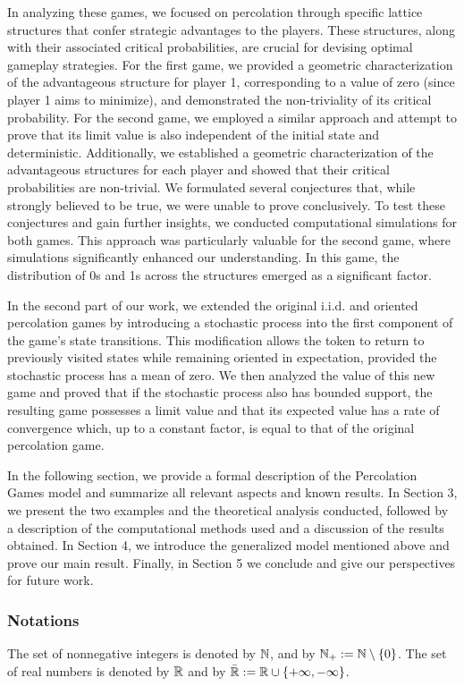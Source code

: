 	In analyzing these games, we focused on percolation through specific lattice structures that confer strategic advantages to the players. These structures, along with their associated critical probabilities, are crucial for devising optimal gameplay strategies. For the first game, we provided a geometric characterization of the advantageous structure for player 1, corresponding to a value of zero (since player 1 aims to minimize), and demonstrated the non-triviality of its critical probability. For the second game, we employed a similar approach and attempt to prove that its limit value is also independent of the initial state and deterministic. Additionally, we established a geometric characterization of the advantageous structures for each player and showed that their critical probabilities are non-trivial. We formulated several conjectures that, while strongly believed to be true, we were unable to prove conclusively. To test these conjectures and gain further insights, we conducted computational simulations for both games. This approach was particularly valuable for the second game, where simulations significantly enhanced our understanding. In this game, the distribution of 0s and 1s across the structures emerged as a significant factor.

	In the second part of our work, we extended the original i.i.d. and oriented percolation games by introducing a stochastic process into the first component of the game's state transitions. This modification allows the token to return to previously visited states while remaining oriented in expectation, provided the stochastic process has a mean of zero. We then analyzed the value of this new game and proved that if the stochastic process also has bounded support, the resulting game possesses a limit value and that its expected value has a rate of convergence which, up to a constant factor, is equal to that of the original percolation game.

	In the following section, we provide a formal description of the Percolation Games model and summarize all relevant aspects and known results. In Section 3, we present the two examples and the theoretical analysis conducted, followed by a description of the computational methods used and a discussion of the results obtained. In Section 4, we introduce the generalized model mentioned above and prove our main result. Finally, in Section 5 we conclude and give our perspectives for future work.


	\subsubsection*{Notations} The set of nonnegative integers is denoted by $\mathbb{N}$, and by $\mathbb{N}_+ := \mathbb{N} \setminus \{0\}$. The set of real numbers is denoted by $\mathbb{R}$ and by $\bar{\mathbb{R}} := \mathbb{R} \cup \{+\infty, -\infty\}$.

